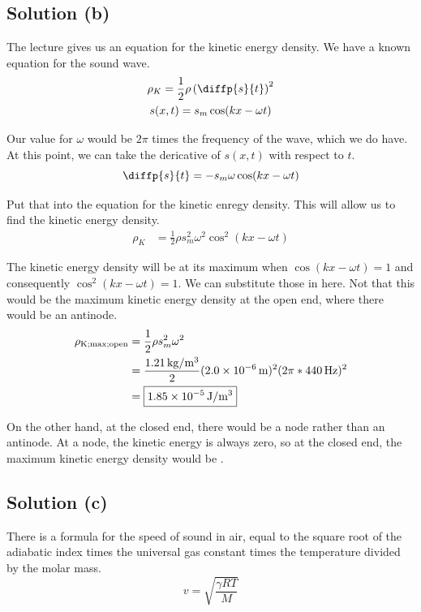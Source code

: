 \documentclass[12pt]{article}
\newcommand{\E}[1]{\times 10^{#1}}
\begin{document}
        \subsection{Solution (b)}
            The lecture gives us an equation for the kinetic energy density.
            We have a known equation for the sound wave.
            \begin{gather}
                \rho_K  =   \frac{1}{2} \rho \left( \diffp{s}{t} \right)^2\\
                s(x,t)  =   s_m \cos(kx - \omega t)
            \end{gather}

            Our value for $\omega$ would be $2\pi$ times the frequency of the wave, which we do have.
            At this point, we can take the dericative of $s(x,t)$ with respect to $t$.
            \begin{equation}
                \diffp{s}{t}    =   -s_m \omega \cos(kx - \omega t)
            \end{equation}

            Put that into the equation for the kinetic enregy density.
            This will allow us to find the kinetic energy density.
            \begin{align}
                \rho_K  &=  \frac{1}{2} \rho s_m^2 \omega^2 \cos^2(kx - \omega t)
            \end{align}

            The kinetic energy density will be at its maximum when $\cos(kx - \omega t) = 1$ and consequently $\cos^2(kx - \omega t) = 1$.
            We can substitute those in here.
            Not that this would be the maximum kinetic energy density at the open end, where there would be an antinode.
            \begin{align}
                \rho_{\rm K;max;open}   &=  \frac{1}{2} \rho s_m^2 \omega^2\\
                    &=  \frac{1.21\,\unit{\kilo\gram/\meter^3}}{2} (2.0\E{-6}\,\unit{\meter})^2 (2\pi * 440\,\unit{\hertz})^2\\
                    &=  \boxed{1.85\E{-5}\,\unit{\joule/\meter^3}}
            \end{align}

            On the other hand, at the closed end, there would be a node rather than an antinode. 
            At a node, the kinetic energy is always zero, so at the closed end, the maximum kinetic energy density would be .

        \subsection{Solution (c)}
            There is a formula for the speed of sound in air, equal to the square root of the adiabatic index times the universal gas constant times the temperature divided by the molar mass.
            \begin{equation}
                v = \sqrt{\frac{\gamma R T}{M}}
            \end{equation}
\end{document}
